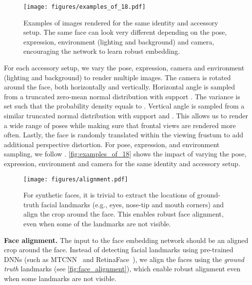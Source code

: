 \documentclass[10pt,twocolumn,letterpaper]{article}
\begin{document}
\begin{figure}[t]
\begin{center}
\texttt{[image: figures/examples\_of\_18.pdf]}
\end{center}
\caption{Examples of images rendered for the same identity and accessory setup. The same face can look very different depending on the pose, expression, environment (lighting and background) and camera, encouraging the network to learn robust embedding.}
\label{fig:examples_of_18}
\end{figure}

For each accessory setup, we vary the pose, expression, camera and environment (lighting and background) to render multiple images.
The camera is rotated around the face, both horizontally and vertically. 
Horizontal angle is sampled from a truncated zero-mean normal distribution with support . 
The variance is set such that the probability density  equals to . 
Vertical angle is sampled from a similar truncated normal distribution with support  and . 
This allows us to render a wide range of poses while making sure that frontal views are rendered more often. 
Lastly, the face is randomly translated within the viewing frustum to add additional perspective distortion. 
For pose, expression, and environment sampling, we follow \cite{2021_FakeItMakeIt}. 
\autoref{fig:examples_of_18} shows the impact of varying the pose, expression, environment and camera for the same identity and accessory setup.

\begin{figure}[t]
\begin{center}
\texttt{[image: figures/alignment.pdf]}
\end{center}
\caption{For synthetic faces, it is trivial to extract the locations of ground-truth facial landmarks (e.g., eyes, nose-tip and mouth corners) and align the crop around the face. This enables robust face alignment, even when some of the landmarks are not visible.
}
\label{fig:face_alignment}
\end{figure}

\noindent
\textbf{Face alignment.} 
The input to the face embedding network should be an aligned crop around the face. 
Instead of detecting facial landmarks using pre-trained DNNs (such as MTCNN~\cite{2016_mtcnn} and RetinaFace~\cite{2020_retinaface}), we align the faces using the \textit{ground truth} landmarks (see \autoref{fig:face_alignment}), which enable robust alignment even when some landmarks are not visible.
\end{document}
